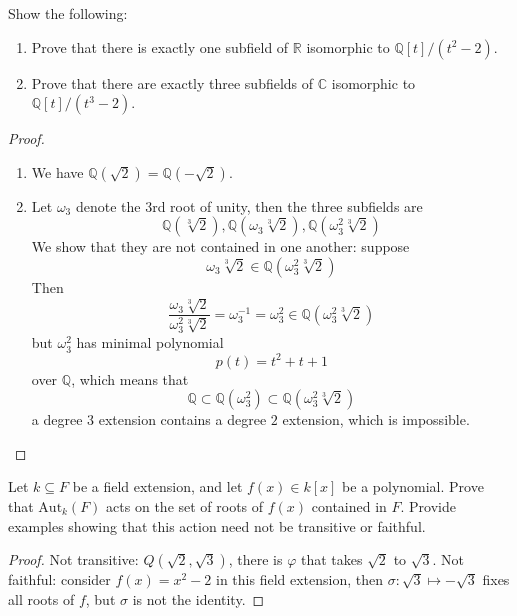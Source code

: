 \documentclass[openany]{book}
\newcommand{\Q}{\mathbb{Q}}
\newcommand{\om}{\omega}
\begin{document}
\begin{prob}
    Show the following:
\begin{enumerate}
    \item Prove that there is exactly one subfield of \(\mathbb{R}\) isomorphic to \(\mathbb{Q}[t]/(t^2 - 2)\).
    \item Prove that there are exactly three subfields of \(\mathbb{C}\) isomorphic to \(\mathbb{Q}[t]/(t^3 - 2)\).
\end{enumerate}
\end{prob}
\begin{proof}
    \begin{enumerate}
        \item We have $\Q(\sqrt{2})=\Q(-\sqrt{2})$.
        \item Let $\om_3$ denote the $3$rd root of unity, then the three subfields are 
        \begin{equation*}
            \Q(\sqrt[3]{2}), \Q(\om_3\sqrt[3]{2}), \Q(\om_3^2\sqrt[3]{2})
        \end{equation*}
        We show that they are not contained in one another: suppose 
        \begin{equation*}
            \om_3\sqrt[3]{2}\in\Q(\om_3^2\sqrt[3]{2})
        \end{equation*}
        Then 
        \begin{equation*}
            \frac{\om_3\sqrt[3]{2}}{\om_3^2\sqrt[3]{2}}=\om_3^{-1}=\om_3^2\in\Q(\om_3^2\sqrt[3]{2})
        \end{equation*}
        but $\om_3^2$ has minimal polynomial 
        \begin{equation*}
            p(t)=t^2+t+1
        \end{equation*}
        over $\Q$, which means that 
        \begin{equation*}
            \Q\subset\Q(\om_3^2)\subset\Q(\om_3^2\sqrt[3]{2})
        \end{equation*}
        a degree $3$ extension contains a degree $2$ extension, which is impossible.
    \end{enumerate}
\end{proof}

\begin{prob}
Let \( k \subseteq F \) be a field extension, and let \( f(x) \in k[x] \) be a polynomial. Prove that \(\text{Aut}_k(F)\) acts on the set of roots of \( f(x) \) contained in \(F\). Provide examples showing that this action need not be transitive or faithful.
\end{prob}
\begin{proof}
    Not transitive: $Q(\sqrt{2}, \sqrt{3})$, there is $\varphi$ that takes $\sqrt{2}$ to $\sqrt{3}$. Not faithful: consider $f(x)=x^2-2$ in this field extension, then $\sigma: \sqrt{3}\mapsto -\sqrt{3}$ fixes all roots of $f$, but $\sigma$ is not the identity.
\end{proof}
\end{document}
